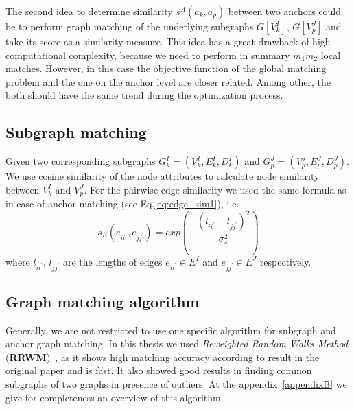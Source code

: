 The second idea to determine similarity $s^A(a_k, a_p)$ between two anchors could be to perform graph matching of the underlying subgraphs $G[V^I_k]$, $G[V^J_p]$ and take its score as a similarity measure. This idea has a great drawback of high computational complexity, because we need to perform in summary $m_1m_2$ local matches. However, in this case the objective function of the global matching problem and the one on the anchor level are closer related. Among other, the both should have the same trend during the optimization process.~
\subsection{Subgraph matching}
Given two corresponding subgraphs $G^I_{k}=(V^I_{k},E^I_{k},D^I_{k})$ and $G^J_{p}=(V^J_{p},E^J_{p},D^J_{p})$. We use cosine similarity of the node attributes to calculate node similarity between $V^I_{k}$ and $V^J_{p}$. For the pairwise edge similarity we used the same formula as in case of anchor matching (see Eq.\eqref{eq:edge_sim1}), i.e.\ 
\begin{equation*}
s_E(e_{ii^\prime}, e_{jj^\prime}) = exp(-\frac{(l_{ii^\prime} - l_{jj^\prime})^2}{\sigma^2_{s}})
\end{equation*}
where $l_{ii^\prime}$, $l_{jj^\prime} $ are the lengths of edges $e_{ii^\prime}\in E^I$ and $e_{jj^\prime}\in E^J$ respectively.

\subsection{Graph matching algorithm}
Generally, we are not restricted to use one specific algorithm for subgraph and anchor graph matching. In this thesis we used \emph{Reweighted Random Walks Method} (\textbf{RRWM})~\cite{Cho2010_RRWM}, as it shows high matching accuracy according to result in the original paper and is fast. It also showed good results in finding common subgraphs of two graphs in presence of outliers. At the appendix~\ref{appendixB} we give for completeness an overview of this algorithm.

